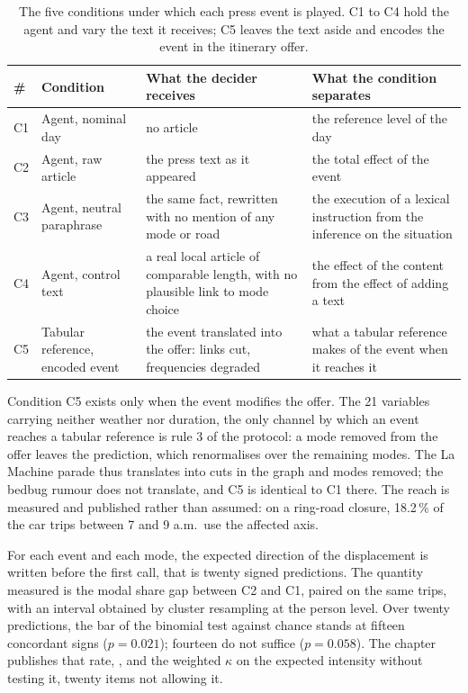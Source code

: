 \begin{table}[tp]
  \caption{The five conditions under which each press event is played. C1 to C4 hold the agent and vary the text it receives; C5 leaves the text aside and encodes the event in the itinerary offer.}
  \label{tab:conditions}
  \begin{tabular}{llp{}p{}}
    \toprule
    \# & Condition & What the decider receives & What the condition separates \\
    \midrule
    C1 & Agent, nominal day        & no article & the reference level of the day \\
    C2 & Agent, raw article        & the press text as it appeared & the total effect of the event \\
    C3 & Agent, neutral paraphrase & the same fact, rewritten with no mention of any mode or road & the execution of a lexical instruction from the inference on the situation \\
    C4 & Agent, control text       & a real local article of comparable length, with no plausible link to mode choice & the effect of the content from the effect of adding a text \\
    C5 & Tabular reference, encoded event & the event translated into the offer: links cut, frequencies degraded & what a tabular reference makes of the event when it reaches it \\
    \bottomrule
  \end{tabular}
\end{table}

Condition C5 exists only when the event modifies the offer. The 21 variables carrying neither weather nor duration, the only channel by which an event reaches a tabular reference is rule 3 of the protocol: a mode removed from the offer leaves the prediction, which renormalises over the remaining modes. The La Machine parade thus translates into cuts in the graph and modes removed; the bedbug rumour does not translate, and C5 is identical to C1 there. The reach is measured and published rather than assumed: on a ring-road closure, 18.2\,\% of the car trips between 7 and 9 a.m.\ use the affected axis.

For each event and each mode, the expected direction of the displacement is written before the first call, that is twenty signed predictions. The quantity measured is the modal share gap between C2 and C1, paired on the same trips, with an interval obtained by cluster resampling at the person level. Over twenty predictions, the bar of the binomial test against chance stands at fifteen concordant signs ($p = 0.021$); fourteen do not suffice ($p = 0.058$). The chapter publishes that rate, , and the weighted $\kappa$ on the expected intensity without testing it, twenty items not allowing it.

